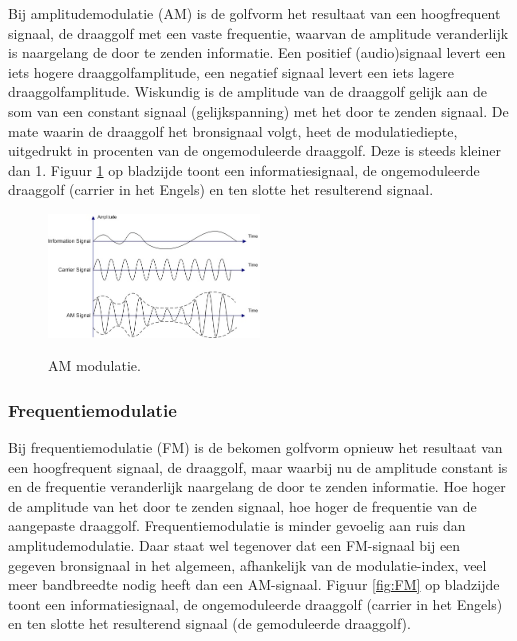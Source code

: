 Bij amplitudemodulatie \cite{kennedy} (AM) is de golfvorm het resultaat van een hoogfrequent signaal, de draaggolf met een vaste frequentie, waarvan de amplitude veranderlijk is naargelang de door te zenden informatie. Een positief (audio)signaal levert een iets hogere draaggolfamplitude, een negatief signaal levert een iets lagere draaggolfamplitude. Wiskundig is de amplitude van de draaggolf gelijk aan de som van een constant signaal (gelijkspanning) met het door te zenden signaal. De mate waarin de draaggolf het bronsignaal volgt, heet de modulatiediepte, uitgedrukt in procenten van de ongemoduleerde draaggolf. Deze is steeds kleiner dan 1. Figuur \ref{fig:AM} op bladzijde \pageref{fig:AM} toont een informatiesignaal, de ongemoduleerde draaggolf (carrier in het Engels) en ten slotte het resulterend signaal.

\begin{figure}[ht]
  \centering
  \includegraphics[width=0.5\textwidth]{voorbeeld_figuren/AM}
  \caption{AM modulatie.}
  \cite{AM}
  \label{fig:AM}
\end{figure}

\subsubsection{Frequentiemodulatie}

Bij frequentiemodulatie \cite{kennedy} (FM) is de bekomen golfvorm opnieuw het resultaat van een hoogfrequent signaal, de draaggolf, maar waarbij nu de amplitude constant is en de frequentie veranderlijk naargelang de door te zenden informatie. Hoe hoger de amplitude van het door te zenden signaal, hoe hoger de frequentie van de aangepaste draaggolf. Frequentiemodulatie is minder gevoelig aan ruis dan amplitudemodulatie. Daar staat wel tegenover dat een FM-signaal bij een gegeven bronsignaal in het algemeen, afhankelijk van de modulatie-index, veel meer bandbreedte nodig heeft dan een AM-signaal. Figuur \ref{fig:FM} op bladzijde \pageref{fig:FM} toont een informatiesignaal, de ongemoduleerde draaggolf (carrier in het Engels) en ten slotte het resulterend signaal (de gemoduleerde draaggolf).

